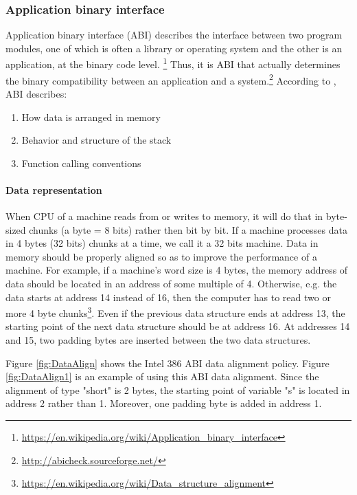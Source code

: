         \subsubsection{Application binary interface}
            Application binary interface (ABI) describes the interface between two program modules, one of which is often a library or operating system  and the other is an application, at the binary code level. \footnote{\url{https://en.wikipedia.org/wiki/Application\_binary\_interface}}
            Thus, it is ABI that actually determines the binary compatibility between an application and a system.\footnote{\url{http://abicheck.sourceforge.net/}}\newline    
           According to \cite{ALTERA-14}, ABI describes:   
           \begin{enumerate}
              \item  How data is arranged in memory
              \item  Behavior and structure of the stack
              \item  Function calling conventions
            \end{enumerate}
            
        
            
            \paragraph{Data representation}
            When CPU of a machine reads from or writes to memory, it will do that in byte-sized chunks (a byte = 8 bits) rather then bit by bit. If a machine processes data in 4 bytes (32 bits) chunks at a time, we call it a 32 bits machine. Data in memory should be properly aligned so as to improve the performance of a machine. For example, if a machine's word size is 4 bytes, the memory address of data should be located in an address of some multiple of 4. Otherwise, e.g. the data starts at address 14 instead of 16, then the computer has to read two or more 4 byte chunks\footnote{\url{https://en.wikipedia.org/wiki/Data_structure_alignment}}. Even if the previous data structure ends at address 13, the starting point of the next data structure should be at address 16. At addresses 14 and 15, two padding bytes are inserted between the two data structures.
            
            Figure \ref{fig:DataAlign} shows the Intel 386 ABI data alignment policy. Figure \ref{fig:DataAlign1} is an example of using this ABI data alignment. Since the alignment of type "short" is 2 bytes, the starting point of variable "s" is located in address 2 rather than 1. Moreover, one padding byte is added in address 1.
             

